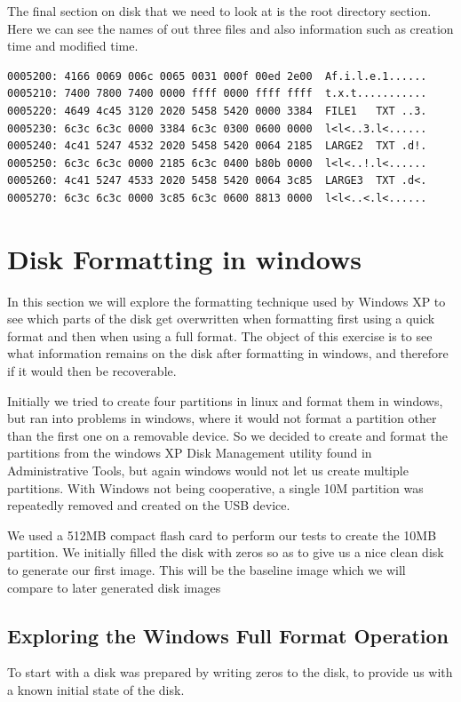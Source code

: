 \documentclass[a4paper,
    11pt,
    normalheadings,
    parindent,
    UKenglish,
    abstracton,
    ]{scrartcl}
\begin{document}
The final section on disk that we need to look at is the root directory section. Here we can see the names of out three files and also information such as creation time and modified time.
\begin{verbatim}
0005200: 4166 0069 006c 0065 0031 000f 00ed 2e00  Af.i.l.e.1......
0005210: 7400 7800 7400 0000 ffff 0000 ffff ffff  t.x.t...........
0005220: 4649 4c45 3120 2020 5458 5420 0000 3384  FILE1   TXT ..3.
0005230: 6c3c 6c3c 0000 3384 6c3c 0300 0600 0000  l<l<..3.l<......
0005240: 4c41 5247 4532 2020 5458 5420 0064 2185  LARGE2  TXT .d!.
0005250: 6c3c 6c3c 0000 2185 6c3c 0400 b80b 0000  l<l<..!.l<......
0005260: 4c41 5247 4533 2020 5458 5420 0064 3c85  LARGE3  TXT .d<.
0005270: 6c3c 6c3c 0000 3c85 6c3c 0600 8813 0000  l<l<..<.l<......
\end{verbatim}

\section{Disk Formatting in windows}

In this section we will explore the formatting technique used by Windows XP to see which parts of the disk get overwritten when formatting first using a quick format and then when using a full format. The object of this exercise is to see what information remains on the disk after formatting in windows, and therefore if it would then be recoverable.

Initially we tried to create four partitions in linux and format them in windows, but ran into problems in windows, where it would not format a partition other than the first one on a removable device. So we decided to create and format the partitions from the windows XP Disk Management utility found in Administrative Tools, but again windows would not let us create multiple partitions. With Windows not being cooperative,  a single 10M partition was repeatedly removed and created on the USB device.

We used a 512MB compact flash card to perform our tests to create the 10MB partition. We initially filled the disk with zeros so as to give us a nice clean disk to generate our first image. This will be the baseline image which we will compare to later generated disk images

\subsection{Exploring the Windows Full Format Operation}
To start with a disk was prepared by writing zeros to the disk, to provide us with a known initial state of the disk.
\end{document}
